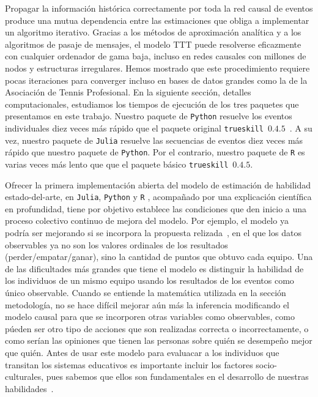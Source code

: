 \documentclass[a4paper,11pt]{book}
\theoremstyle{definition}
\begin{document}
Propagar la información histórica correctamente por toda la red causal de eventos produce una mutua dependencia entre las estimaciones que obliga a implementar un algoritmo iterativo.
%
Gracias a los métodos de aproximación analítica y a los algoritmos de pasaje de mensajes, el modelo TTT puede resolverse eficazmente con cualquier ordenador de gama baja, incluso en redes causales con millones de nodos y estructuras irregulares.
%
Hemos mostrado que este procedimiento requiere pocas iteraciones para converger incluso en bases de datos grandes como la de la Asociación de Tennis Profesional.
%
En la siguiente sección, detalles computacionales, estudiamos los tiempos de ejecución de los tres paquetes que presentamos en este trabajo.
%
Nuestro paquete de \texttt{Python} resuelve los eventos individuales diez veces más rápido que el paquete original \texttt{trueskill}~$0.4.5$~\cite{Lee2012}.
%
A su vez, nuestro paquete de \texttt{Julia} resuelve las secuencias de eventos diez veces más rápido  que nuestro paquete de \texttt{Python}.
%
Por el contrario, nuestro paquete de \texttt{R} es varias veces más lento que que el paquete básico \texttt{trueskill}~$0.4.5$.

Ofrecer la primera implementaci\'on abierta del modelo de estimaci\'on de habilidad estado-del-arte, en \texttt{Julia}, \texttt{Python} y \texttt{R} , acompañado por una explicaci\'on científica en profundidad, tiene por objetivo establece las condiciones que den inicio a una proceso colectivo continuo de mejora del modelo.
%
Por ejemplo, el modelo ya podría ser mejorando si se incorpora la propuesta relizada~\cite{Guo2012}, en el que los datos observables ya no son los valores ordinales de los resultados (perder/empatar/ganar), sino la cantidad de puntos que obtuvo cada equipo.
%
Una de las dificultades más grandes que tiene el modelo es distinguir la habilidad de los individuos de un mismo equipo usando los resultados de los eventos como único observable.
%
Cuando se entiende la matemática utilizada en la sección metodología, no se hace difícil mejorar aún más la inferencia modificando el modelo causal para que se incorporen otras variables como observables, como púeden ser otro tipo de acciones que son realizadas correcta o incorrectamente, o como serían las opiniones que tienen las personas sobre quién se desempeño mejor que quién.
%
Antes de usar este modelo para evaluacar a los individuos que transitan los sistemas educativos es importante incluir los factores socio-culturales, pues sabemos que ellos son fundamentales en el desarrollo de nuestras habilidades~\cite{VanDerLinden2016}.
%
%
\end{document}
